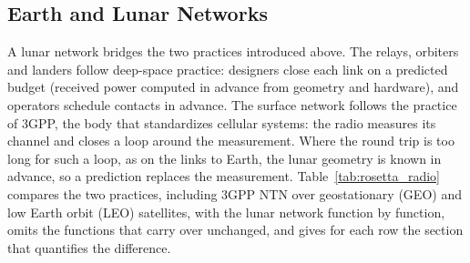 \documentclass{IEEEoj}
\begin{document}
\subsection{Earth and Lunar Networks}
\label{sec:bridge}
A lunar network bridges the two practices introduced above. The relays, orbiters and landers follow deep-space practice: designers close each link on a predicted budget (received power computed in advance from geometry and hardware), and operators schedule contacts in advance. The surface network follows the practice of 3GPP, the body that standardizes cellular systems: the radio measures its channel and closes a loop around the measurement. Where the round trip is too long for such a loop, as on the links to Earth, the lunar geometry is known in advance, so a prediction replaces the measurement. Table~\ref{tab:rosetta_radio} compares the two practices, including 3GPP NTN over geostationary (GEO) and low Earth orbit (LEO) satellites, with the lunar network function by function, omits the functions that carry over unchanged, and gives for each row the section that quantifies the difference.
\end{document}

